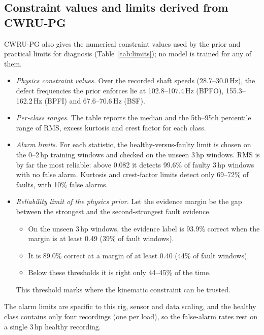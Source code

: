 \documentclass[conference]{IEEEtran}
\begin{document}
\subsection{Constraint values and limits derived from CWRU-PG}
\label{sec:limits}
CWRU-PG also gives the numerical constraint values used by the prior and
practical limits for diagnosis (Table~\ref{tab:limits}); no model is trained
for any of them.
\begin{itemize}
\item \emph{Physics constraint values.} Over the recorded shaft speeds
(28.7--30.0\,Hz), the defect frequencies the prior enforces lie at
102.8--107.4\,Hz (BPFO), 155.3--162.2\,Hz (BPFI) and 67.6--70.6\,Hz (BSF).
\item \emph{Per-class ranges.} The table reports the median and the
5th--95th percentile range of RMS, excess kurtosis and crest factor for each
class.
\item \emph{Alarm limits.} For each statistic, the healthy-versus-faulty limit
is chosen on the 0--2\,hp training windows and checked on the unseen 3\,hp
windows. RMS is by far the most reliable: above 0.082 it detects 99.6\% of
faulty 3\,hp windows with no false alarm. Kurtosis and crest-factor limits
detect only 69--72\% of faults, with 10\% false alarms.
\item \emph{Reliability limit of the physics prior.} Let the evidence margin
be the gap between the strongest and the second-strongest fault evidence.
\begin{itemize}
\item On the unseen 3\,hp windows, the evidence label is 93.9\% correct when
the margin is at least 0.49 (39\% of fault windows).
\item It is 89.0\% correct at a margin of at least 0.40 (44\% of fault
windows).
\item Below these thresholds it is right only 44--45\% of the time.
\end{itemize}
This threshold marks where the kinematic constraint can be trusted.
\end{itemize}
The alarm limits are specific to this rig, sensor and data scaling, and the
healthy class contains only four recordings (one per load), so the false-alarm
rates rest on a single 3\,hp healthy recording.
\end{document}
